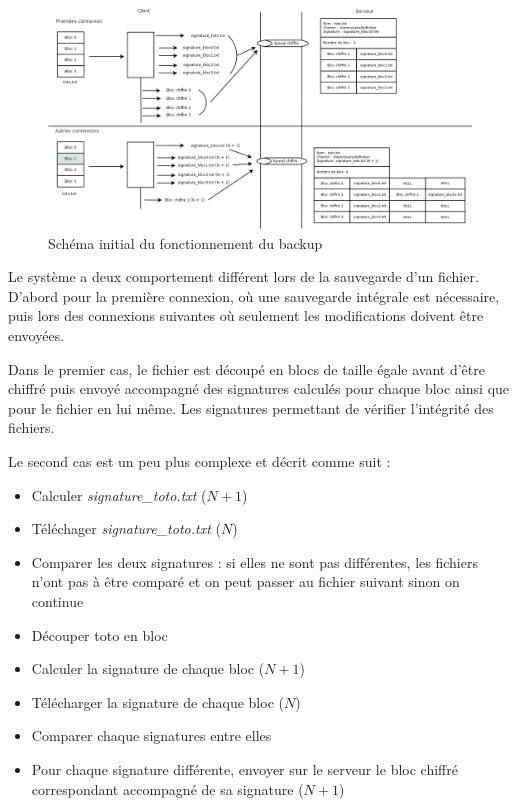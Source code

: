 \documentclass[a4paper,10pt, twoside]{report}
\begin{document}
\begin{spacing}{1.2}
\begin{figure}[h!]
    \hspace{-4.5em}
    \includegraphics[width=19cm]{algo/schemaInitial.png}
    \caption{\label{schemaInitial} Schéma initial du fonctionnement du backup}
\end{figure}

Le système a deux comportement différent lors de la sauvegarde d'un fichier.
D'abord pour la première connexion, où une sauvegarde intégrale est
nécessaire, puis lors des connexions suivantes où seulement les
modifications doivent être envoyées.

Dans le premier cas, le fichier est découpé en blocs de taille égale
avant d'être chiffré puis envoyé accompagné des signatures calculés
pour chaque bloc ainsi que pour le fichier en lui même. Les signatures
permettant de vérifier l'intégrité des fichiers.

Le second cas est un peu plus complexe et décrit comme suit :
\begin{itemize}
 \item Calculer \textit{signature\_toto.txt} (\(N + 1\))
 \item Téléchager \textit{signature\_toto.txt} (\(N\))
 \item Comparer les deux signatures : si elles ne sont pas différentes, les
 fichiers n'ont pas à être comparé et on peut passer au fichier suivant
 sinon on continue
 \item Découper toto en bloc
 \item Calculer la signature de chaque bloc (\(N + 1\))
 \item Télécharger la signature de chaque bloc (\(N\))
 \item Comparer chaque signatures entre elles
 \item Pour chaque signature différente, envoyer sur le serveur le bloc
 chiffré correspondant accompagné de sa signature (\(N + 1\))
\end{itemize}


\end{spacing}
\end{document}
